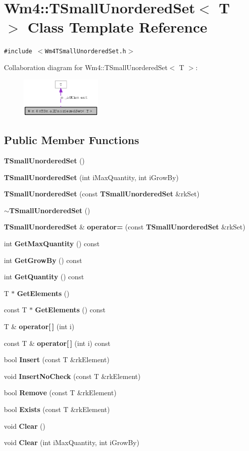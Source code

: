 \section{Wm4::TSmall\-Unordered\-Set$<$ T $>$ Class Template Reference}
\label{classWm4_1_1TSmallUnorderedSet}
{\tt \#include $<$Wm4TSmall\-Unordered\-Set.h$>$}

Collaboration diagram for Wm4::TSmall\-Unordered\-Set$<$ T $>$:\begin{figure}[H]
\begin{center}
\leavevmode
\includegraphics[width=113pt]{classWm4_1_1TSmallUnorderedSet__coll__graph}
\end{center}
\end{figure}
\subsection*{Public Member Functions}
\begin{CompactItemize}
\item 
{\bf TSmall\-Unordered\-Set} ()
\item 
{\bf TSmall\-Unordered\-Set} (int i\-Max\-Quantity, int i\-Grow\-By)
\item 
{\bf TSmall\-Unordered\-Set} (const {\bf TSmall\-Unordered\-Set} \&rk\-Set)
\item 
{\bf $\sim$TSmall\-Unordered\-Set} ()
\item 
{\bf TSmall\-Unordered\-Set} \& {\bf operator=} (const {\bf TSmall\-Unordered\-Set} \&rk\-Set)
\item 
int {\bf Get\-Max\-Quantity} () const
\item 
int {\bf Get\-Grow\-By} () const
\item 
int {\bf Get\-Quantity} () const
\item 
T $\ast$ {\bf Get\-Elements} ()
\item 
const T $\ast$ {\bf Get\-Elements} () const
\item 
T \& {\bf operator[$\,$]} (int i)
\item 
const T \& {\bf operator[$\,$]} (int i) const
\item 
bool {\bf Insert} (const T \&rk\-Element)
\item 
void {\bf Insert\-No\-Check} (const T \&rk\-Element)
\item 
bool {\bf Remove} (const T \&rk\-Element)
\item 
bool {\bf Exists} (const T \&rk\-Element)
\item 
void {\bf Clear} ()
\item 
void {\bf Clear} (int i\-Max\-Quantity, int i\-Grow\-By)
\end{CompactItemize}
